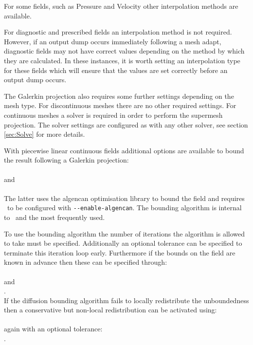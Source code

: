For some fields, such as Pressure and Velocity other interpolation methods are available.

For diagnostic and prescribed fields an interpolation method is not required. However, if an output dump
occurs immediately following a mesh adapt, diagnostic fields may not have correct values depending
on the method by which they are calculated. In these instances, it is worth setting an interpolation type
for these fields which will ensure that the values are set correctly before an output dump occurs.

The Galerkin projection also requires some further settings depending on the mesh type. For discontinuous
meshes there are no other required settings.  For continuous meshes a solver is required in order
to perform the supermesh projection. The solver settings are configured as with any other solver, see
section \ref{sec:Solve} for more details.

With piecewise linear continuous fields additional options are available to bound the result following a Galerkin projection:\\
\\
and\\
\\
The latter uses the algencan optimisation library to bound the field and requires \fluidity\ to be configured with \lstinline [language=bash]+--enable-algencan+.  The  bounding algorithm is internal to \fluidity\ and the most frequently used.

To use the  bounding algorithm \citep{farrell2009a} the number of iterations the algorithm is allowed to take must be specified.  Additionally an optional tolerance can be specified to terminate this iteration loop early.  Furthermore if the bounds on the field are known in advance then these can be specified through:\\
\\
and\\
.\\
If the diffusion bounding algorithm fails to locally redistribute the unboundedness then a conservative but non-local redistribution can be activated using:\\
\\
again with an optional tolerance:\\
.

